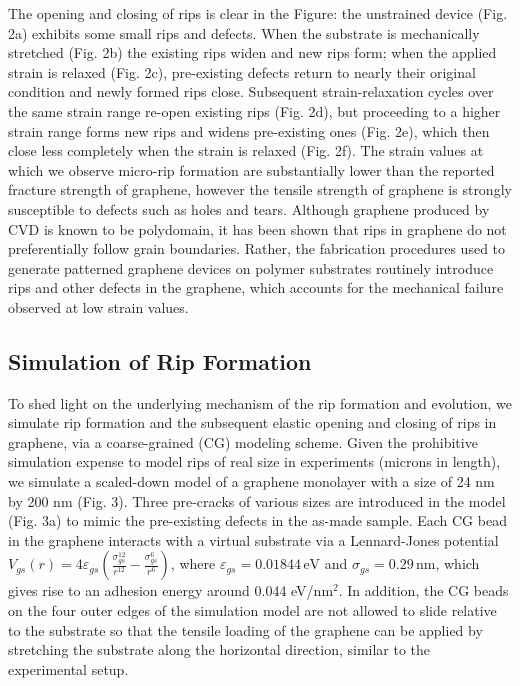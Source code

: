 \documentclass[%
 aps,
 pra,
 longbibliography,
 amsmath,amssymb,
 reprint,
 superscriptaddress,
]{revtex4-1}
\begin{document}
The opening and closing of rips is clear in the Figure:  the unstrained device
(Fig. 2a) exhibits some small rips and defects. When the substrate is
mechanically stretched (Fig. 2b) the existing rips widen and new rips form;
when the applied strain is relaxed (Fig. 2c), pre-existing defects return to
nearly their original condition and newly formed rips close. Subsequent
strain-relaxation cycles over the same strain range re-open existing rips (Fig.
2d), but proceeding to a higher strain range forms new rips and widens
pre-existing ones (Fig. 2e), which then close less completely when the strain
is relaxed (Fig. 2f). The strain values at which we observe micro-rip formation
are substantially lower than the reported fracture strength of
graphene\cite{Lee2008}, however the tensile strength of graphene is strongly
susceptible to defects such as holes and tears\cite{Lee2013}. Although graphene
produced by CVD is known to be polydomain, it has been shown that rips in
graphene do not preferentially follow grain boundaries\cite{Kim2012}. Rather,
the fabrication procedures used to generate patterned graphene devices on
polymer substrates routinely introduce rips and other defects in the graphene,
which accounts for the mechanical failure observed at low strain values.

\subsection{Simulation of Rip Formation}
To shed light on the underlying mechanism of the rip formation and evolution,
we simulate rip formation and the subsequent elastic opening and closing of
rips in graphene, via a coarse-grained (CG) modeling scheme\cite{Zhu2014}.
Given the prohibitive simulation expense to model rips of real size in
experiments (microns in length), we simulate a scaled-down model of a graphene
monolayer with a size of 24 nm by 200 nm (Fig. 3). Three pre-cracks of various
sizes are introduced in the model (Fig. 3a) to mimic the pre-existing defects
in the as-made sample. Each CG bead in the graphene interacts with a virtual
substrate via a Lennard-Jones potential\cite{Scharfenberg2011} $V_{gs}(r)
=4\varepsilon_{gs} \left( \frac{\sigma_{gs}^{12}}{r^{12}} -
\frac{\sigma_{gs}^6}{r^6} \right)$, where $\varepsilon_{gs}=0.01844 \,
\text{eV}$ and $\sigma_{gs}=0.29 \, \text{nm}$, which gives rise to an adhesion
energy around 0.044 eV/nm$^{2}$. In addition, the CG beads on the four outer
edges of the simulation model are not allowed to slide relative to the
substrate so that the tensile loading of the graphene can be applied by
stretching the substrate along the horizontal direction, similar to the
experimental setup.
\end{document}
